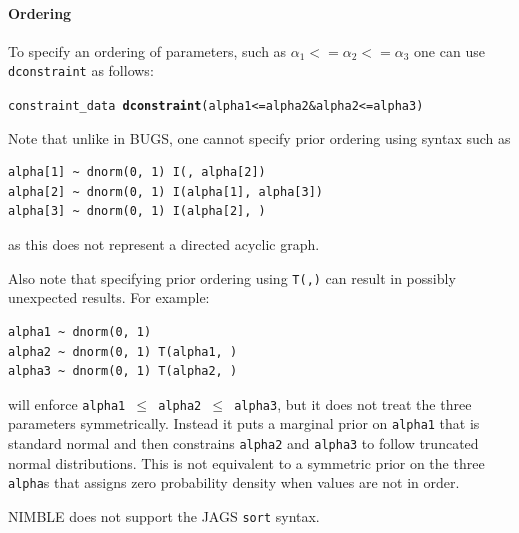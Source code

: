 \documentclass[12pt,oneside]{book}\usepackage[]{graphicx}\usepackage[]{color}
\makeatletter
\newcommand{\hlopt}[1]{\textcolor[rgb]{0,0,0}{#1}}%
\newcommand{\hlstd}[1]{\textcolor[rgb]{0.345,0.345,0.345}{#1}}%
\newcommand{\hlkwd}[1]{\textcolor[rgb]{0.737,0.353,0.396}{\textbf{#1}}}%
\newenvironment{kframe}{%
 \def\at@end@of@kframe{}%
 \ifinner\ifhmode%
  \def\at@end@of@kframe{\end{minipage}}%
  \begin{minipage}{\columnwidth}%
 \fi\fi%
 \def\FrameCommand##1{\hskip\@totalleftmargin \hskip-\fboxsep
 \colorbox{shadecolor}{##1}\hskip-\fboxsep
     \hskip-\linewidth \hskip-\@totalleftmargin \hskip\columnwidth}%
 \MakeFramed {\advance\hsize-\width
   \@totalleftmargin\z@ \linewidth\hsize
   \@setminipage}}%
 {\par\unskip\endMakeFramed%
 \at@end@of@kframe}
\newenvironment{knitrout}{}{} %
\def\cd#1{\texttt{#1}}
\makeatother
\begin{document}
\paragraph{Ordering}

To specify an ordering of parameters, such as $\alpha_1 <= \alpha_2 <= \alpha_3$ one can use \cd{dconstraint} as follows: 
\begin{knitrout}
\color{fgcolor}\begin{kframe}
\begin{alltt}
\hlstd{constraint_data} \hlopt{~} \hlkwd{dconstraint}\hlstd{( alpha1} \hlopt{<=} \hlstd{alpha2} \hlopt{&} \hlstd{alpha2} \hlopt{<=} \hlstd{alpha3 )}
\end{alltt}
\end{kframe}
\end{knitrout}

Note that unlike in BUGS, one cannot specify prior ordering using syntax such as
\begin{verbatim}
alpha[1] ~ dnorm(0, 1) I(, alpha[2])
alpha[2] ~ dnorm(0, 1) I(alpha[1], alpha[3])
alpha[3] ~ dnorm(0, 1) I(alpha[2], )
\end{verbatim}
as this does not represent a directed acyclic graph. 

Also note that specifying prior ordering using \cd{T(,)} can result in possibly unexpected results.  For example:
\begin{verbatim}
alpha1 ~ dnorm(0, 1)
alpha2 ~ dnorm(0, 1) T(alpha1, )
alpha3 ~ dnorm(0, 1) T(alpha2, )
\end{verbatim}
will enforce \cd{alpha1 $\le$ alpha2 $\le$ alpha3}, but it does not treat the three parameters symmetrically.  Instead it puts a marginal prior on \cd{alpha1} that is standard normal and then constrains \cd{alpha2} and \cd{alpha3} to follow truncated normal distributions. This is not equivalent to a symmetric prior on the three \cd{alpha}s that assigns zero probability density when values are not in order.

NIMBLE does not support the JAGS \cd{sort} syntax.




\end{document}
